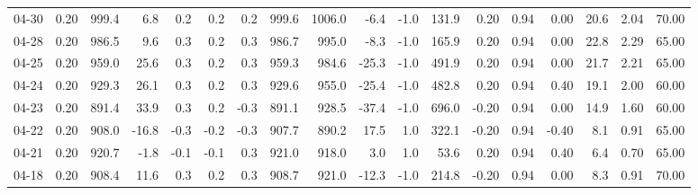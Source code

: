 \begin{threeparttable}
{\begin{tabular}{lrrrrrrrrrrrrrrrrr}
  04-30 &     0.20 &  999.4 &               6.8 &               0.2 &                0.2 &                0.2 &  999.6 & 1006.0 &       -6.4 &                     -1.0 &               131.9 &       0.20 &      0.94 &           0.00 &             20.6 &            2.04 &                  70.00 \\
  04-28 &     0.20 &  986.5 &               9.6 &               0.3 &                0.2 &                0.3 &  986.7 &  995.0 &       -8.3 &                     -1.0 &               165.9 &       0.20 &      0.94 &           0.00 &             22.8 &            2.29 &                  65.00 \\
  04-25 &     0.20 &  959.0 &              25.6 &               0.3 &                0.2 &                0.3 &  959.3 &  984.6 &      -25.3 &                     -1.0 &               491.9 &       0.20 &      0.94 &           0.00 &             21.7 &            2.21 &                  65.00 \\
  04-24 &     0.20 &  929.3 &              26.1 &               0.3 &                0.2 &                0.3 &  929.6 &  955.0 &      -25.4 &                     -1.0 &               482.8 &       0.20 &      0.94 &           0.40 &             19.1 &            2.00 &                  60.00 \\
  04-23 &     0.20 &  891.4 &              33.9 &               0.3 &                0.2 &               -0.3 &  891.1 &  928.5 &      -37.4 &                     -1.0 &               696.0 &      -0.20 &      0.94 &           0.00 &             14.9 &            1.60 &                  60.00 \\
  04-22 &     0.20 &  908.0 &             -16.8 &              -0.3 &               -0.2 &               -0.3 &  907.7 &  890.2 &       17.5 &                      1.0 &               322.1 &      -0.20 &      0.94 &          -0.40 &              8.1 &            0.91 &                  65.00 \\
  04-21 &     0.20 &  920.7 &              -1.8 &              -0.1 &               -0.1 &                0.3 &  921.0 &  918.0 &        3.0 &                      1.0 &                53.6 &       0.20 &      0.94 &           0.40 &              6.4 &            0.70 &                  65.00 \\
  04-18 &     0.20 &  908.4 &              11.6 &               0.3 &                0.2 &                0.3 &  908.7 &  921.0 &      -12.3 &                     -1.0 &               214.8 &      -0.20 &      0.94 &           0.00 &              8.3 &            0.91 &                  70.00 \\

\end{tabular}}
\end{threeparttable}
